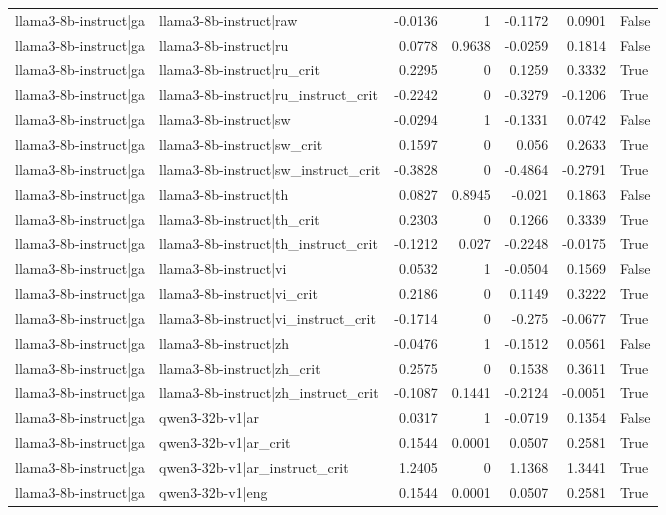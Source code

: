\begin{table}
\begin{tabular}{l l r r r r l}
llama3-8b-instruct|ga & llama3-8b-instruct|raw & -0.0136 & 1 & -0.1172 & 0.0901 & False \\
llama3-8b-instruct|ga & llama3-8b-instruct|ru & 0.0778 & 0.9638 & -0.0259 & 0.1814 & False \\
llama3-8b-instruct|ga & llama3-8b-instruct|ru_crit & 0.2295 & 0 & 0.1259 & 0.3332 & True \\
llama3-8b-instruct|ga & llama3-8b-instruct|ru_instruct_crit & -0.2242 & 0 & -0.3279 & -0.1206 & True \\
llama3-8b-instruct|ga & llama3-8b-instruct|sw & -0.0294 & 1 & -0.1331 & 0.0742 & False \\
llama3-8b-instruct|ga & llama3-8b-instruct|sw_crit & 0.1597 & 0 & 0.056 & 0.2633 & True \\
llama3-8b-instruct|ga & llama3-8b-instruct|sw_instruct_crit & -0.3828 & 0 & -0.4864 & -0.2791 & True \\
llama3-8b-instruct|ga & llama3-8b-instruct|th & 0.0827 & 0.8945 & -0.021 & 0.1863 & False \\
llama3-8b-instruct|ga & llama3-8b-instruct|th_crit & 0.2303 & 0 & 0.1266 & 0.3339 & True \\
llama3-8b-instruct|ga & llama3-8b-instruct|th_instruct_crit & -0.1212 & 0.027 & -0.2248 & -0.0175 & True \\
llama3-8b-instruct|ga & llama3-8b-instruct|vi & 0.0532 & 1 & -0.0504 & 0.1569 & False \\
llama3-8b-instruct|ga & llama3-8b-instruct|vi_crit & 0.2186 & 0 & 0.1149 & 0.3222 & True \\
llama3-8b-instruct|ga & llama3-8b-instruct|vi_instruct_crit & -0.1714 & 0 & -0.275 & -0.0677 & True \\
llama3-8b-instruct|ga & llama3-8b-instruct|zh & -0.0476 & 1 & -0.1512 & 0.0561 & False \\
llama3-8b-instruct|ga & llama3-8b-instruct|zh_crit & 0.2575 & 0 & 0.1538 & 0.3611 & True \\
llama3-8b-instruct|ga & llama3-8b-instruct|zh_instruct_crit & -0.1087 & 0.1441 & -0.2124 & -0.0051 & True \\
llama3-8b-instruct|ga & qwen3-32b-v1|ar & 0.0317 & 1 & -0.0719 & 0.1354 & False \\
llama3-8b-instruct|ga & qwen3-32b-v1|ar_crit & 0.1544 & 0.0001 & 0.0507 & 0.2581 & True \\
llama3-8b-instruct|ga & qwen3-32b-v1|ar_instruct_crit & 1.2405 & 0 & 1.1368 & 1.3441 & True \\
llama3-8b-instruct|ga & qwen3-32b-v1|eng & 0.1544 & 0.0001 & 0.0507 & 0.2581 & True \\

\end{tabular}
\end{table}

